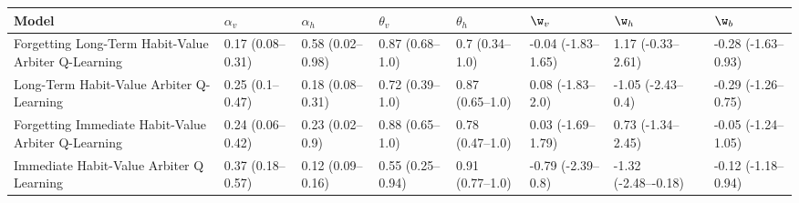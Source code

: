 \begin{tabular}{llllllll}
\toprule
                                              Model &       $\alpha_v$ &       $\alpha_h$ &       $\theta_v$ &      $\theta_h$ &             $\w_v$ &              $\w_h$ &             $\w_b$ \\
\midrule
Forgetting Long-Term Habit-Value Arbiter Q-Learning & 0.17 (0.08–0.31) & 0.58 (0.02–0.98) &  0.87 (0.68–1.0) &  0.7 (0.34–1.0) & -0.04 (-1.83–1.65) &   1.17 (-0.33–2.61) & -0.28 (-1.63–0.93) \\
           Long-Term Habit-Value Arbiter Q-Learning &  0.25 (0.1–0.47) & 0.18 (0.08–0.31) &  0.72 (0.39–1.0) & 0.87 (0.65–1.0) &   0.08 (-1.83–2.0) &   -1.05 (-2.43–0.4) & -0.29 (-1.26–0.75) \\
Forgetting Immediate Habit-Value Arbiter Q-Learning & 0.24 (0.06–0.42) &  0.23 (0.02–0.9) &  0.88 (0.65–1.0) & 0.78 (0.47–1.0) &  0.03 (-1.69–1.79) &   0.73 (-1.34–2.45) & -0.05 (-1.24–1.05) \\
           Immediate Habit-Value Arbiter Q Learning & 0.37 (0.18–0.57) & 0.12 (0.09–0.16) & 0.55 (0.25–0.94) & 0.91 (0.77–1.0) &  -0.79 (-2.39–0.8) & -1.32 (-2.48–-0.18) & -0.12 (-1.18–0.94) \\
\bottomrule
\end{tabular}
